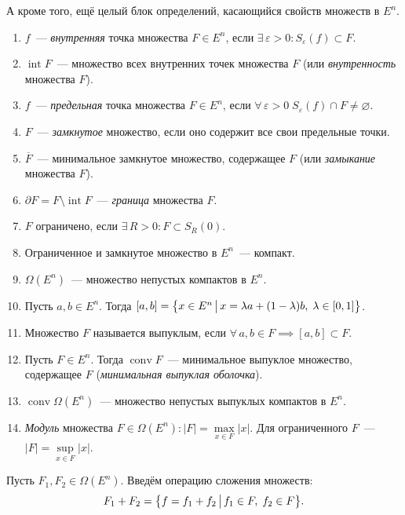 А кроме того, ещё целый блок определений, касающийся свойств множеств в $E^n$.
\begin{enumerate}
    \item $f$~--- \textit{внутренняя} точка множества $F \in E^n$, если $\exists \, \varepsilon > 0\colon S_\varepsilon(f) \subset F$.
    \item $\operatorname{int} F$~--- множество всех внутренних точек множества $F$ (или \textit{внутренность} множества $F$).
    \item $f$~--- \textit{предельная} точка множества $F \in E^n$, если $\forall \, \varepsilon > 0 \; S_\varepsilon(f) \cap F \neq \varnothing$.
    \item $F$~--- \textit{замкнутое} множество, если оно содержит все свои предельные точки.
    \item $\overline{F}$~--- минимальное замкнутое множество, содержащее $F$ (или \textit{замыкание} множества $F$).
    \item $\partial F = F \setminus \operatorname{int} F$~--- \textit{граница} множества $F$.
    \item $F$ ограничено, если $\exists \, R > 0\colon F \subset S_R(0)$.
    \item Ограниченное и замкнутое множество в $E^n$~--- компакт.
    \item $\Omega(E^n)$~--- множество непустых компактов в $E^n$.
    \item Пусть $a, b \in E^n$. Тогда $[a, b] = \bigl\{ x \in E^n \, \bigl| \, x = \lambda a + (1 - \lambda)b, \; \lambda \in [0,1] \bigr\}$.
    \item Множество $F$ называется выпуклым, если $\forall \, a, b \in F \implies [a, b] \subset F$.
    \item Пусть $F \in E^n$. Тогда $\operatorname{conv} F$~--- минимальное выпуклое множество, содержащее $F$ (\textit{минимальная выпуклая оболочка}).
    \item $\operatorname{conv} \Omega(E^n)$~--- множество непустых выпуклых компактов в $E^n$.
    \item \textit{Модуль} множества $F \in \Omega(E^n)\colon |F| = \max\limits_{x \in F} |x|$.
    Для ограниченного $F$~--- $|F| = \sup\limits_{x \in F} |x|$.
\end{enumerate}

\begin{defn}
    Пусть $F_1, F_2 \in \Omega(E^n)$.
    Введём операцию сложения множеств:
    \begin{equation*}
        F_1 + F_2 = \bigl\{f = f_1 + f_2 \, \bigl| \, f_1 \in F, \; f_2 \in F\bigr\}.
    \end{equation*}
\end{defn}

